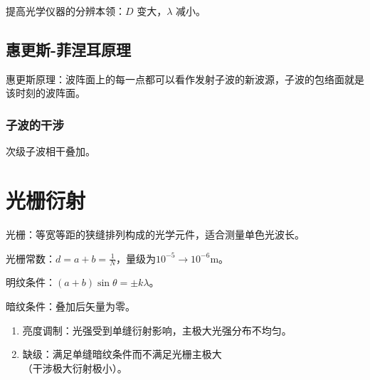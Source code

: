 提高光学仪器的分辨本领：$D$ 变大，$\lambda$ 减小。

\subsection{惠更斯-菲涅耳原理}

惠更斯原理：波阵面上的每一点都可以看作发射子波的新波源，子波的包络面就是该时刻的波阵面。

\subsubsection{子波的干涉}

次级子波相干叠加。

\section{光栅衍射}

光栅：等宽等距的狭缝排列构成的光学元件，适合测量单色光波长。

光栅常数：$d=a+b=\frac{1}{N}$，量级为$10^{-5}\to10^{-6}\mathrm{m}$。

明纹条件：$(a+b)\sin{\theta}=\pm{}k\lambda$。

暗纹条件：叠加后矢量为零。

\begin{enumerate}
    \item 亮度调制：光强受到单缝衍射影响，主极大光强分布不均匀。
    \item 缺级：满足单缝暗纹条件而不满足光栅主极大\\（干涉极大衍射极小）。
\end{enumerate}